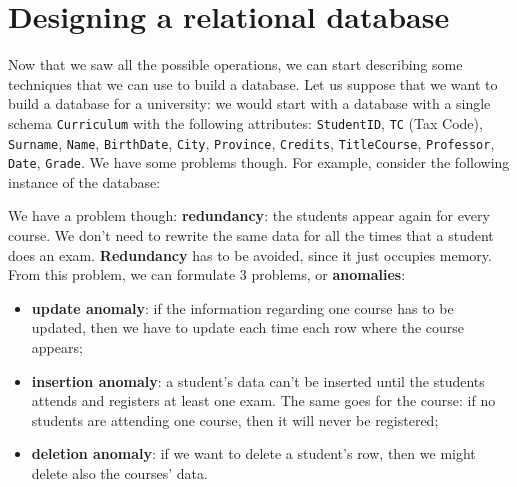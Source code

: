 \section{Designing a relational database}


Now that we saw all the possible operations, we can start describing some techniques that we can use to build a database. Let us suppose that we want to build a database for a university: we would start with a database with a single schema \texttt{Curriculum} with the following attributes: \texttt{StudentID}, \texttt{TC} (Tax Code), \texttt{Surname}, \texttt{Name}, \texttt{BirthDate}, \texttt{City}, \texttt{Province}, \texttt{Credits}, \texttt{TitleCourse}, \texttt{Professor}, \texttt{Date}, \texttt{Grade}.
\nwl
We have some problems though. For example, consider the following instance of the database:
\begin{center}
\end{center}

We have a problem though: \textbf{redundancy}: the students appear again for every course. We don't need to rewrite the same data for all the times that a student does an exam. \textbf{Redundancy} has to be avoided, since it just occupies memory. From this problem, we can formulate 3 problems, or \textbf{anomalies}:
\begin{itemize}
    \item \textbf{update anomaly}: if the information regarding one course has to be updated, then we have to update each time each row where the course appears;
    \item \textbf{insertion anomaly}: a student's data can't be inserted until the students attends and registers at least one exam. The same goes for the course: if no students are attending one course, then it will never be registered;
    \item \textbf{deletion anomaly}: if we want to delete a student's row, then we might delete also the courses' data.
\end{itemize}

